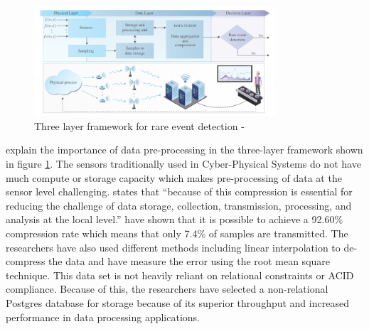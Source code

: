 \begin{figure}[H]
    \centering
    \includegraphics[width=0.8\textwidth]{Images/three-layer-system.PNG}
    \caption{Three layer framework for rare event detection - \cite{three-layer-approach-to-detect-anomalies-in-industrial-environments-based-on-machine-learning}}
    \label{fig:three-layer}
\end{figure}
\cite{three-layer-approach-to-detect-anomalies-in-industrial-environments-based-on-machine-learning} explain the importance of data pre-processing in the three-layer framework shown in figure \ref{fig:three-layer}. The sensors traditionally used in Cyber-Physical Systems do not have much compute or storage capacity which makes pre-processing of data at the sensor level challenging. \cite{compression} states that ``because of this compression is essential for reducing the challenge of data storage, collection, transmission, processing, and analysis at the local level.'' \cite{wp3.2} have shown that it is possible to achieve a 92.60\% compression rate which means that only 7.4\% of samples are transmitted. The researchers have also used different methods including linear interpolation to de-compress the data and have measure the error using the root mean square technique. This data set is not heavily reliant on relational constraints or ACID compliance. Because of this, the researchers have selected a non-relational Postgres database for storage because of its superior throughput and increased performance in data processing applications.


